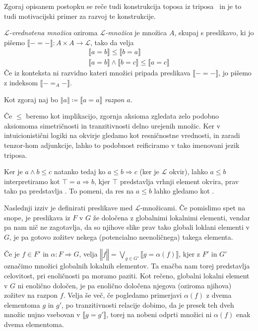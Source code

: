 Zgoraj opisanem postopku se reče tudi konstrukcija toposa iz
triposa~ in je to tudi motivacijski primer za
razvoj te konstrukcije.

\begin{definicija}
  \emph{\(ℒ\)-vrednotena množica} oziroma \emph{\(ℒ\)-množica} je množica \(A\),
  skupaj s preslikavo, ki jo pišemo \(⟦- = -⟧ : A×A → ℒ\), tako da velja
  \begin{align*}
    ⟦ a = b ⟧ ≤ ⟦ b = a ⟧\\
    ⟦ a = b ⟧ ∧ ⟦ b = c ⟧ ≤ ⟦ a = c ⟧
  \end{align*}
  Če iz konteksta ni razvidno kateri množici pripada preslikava \(⟦- = -⟧\),
  jo pišemo z indeksom \(⟦- =_A -⟧\).

  Kot zgoraj naj bo \(‖a‖ ≔ ⟦a = a⟧\) \emph{razpon \(a\)}.
\end{definicija}

Če \(≤\) beremo kot implikacijo, zgornja aksioma zgledata zelo podobno aksiomoma
simetričnosti in tranzitivnosti delno urejenih množic. Ker v intuicionistični
logiki na okvirje gledamo kot resničnostne vrednosti, in zaradi tenzor-hom
adjunkcije, lahko to podobnost reificiramo v tako imenovani jezik triposa.

Ker je \(a∧b ≤ c\) natanko tedaj ko \(a ≤ b⇒c\) (ker je \(ℒ\) okvir),
lahko \(a ≤ b\) interpretiramo kot \(⊤ = a⇒b\), kjer \(⊤\) predstavlja vrhnji
element okvira, prav tako pa predstavlja .
To pomeni, da res na \(a ≤ b\) lahko gledamo kot .

Naslednji izziv je definirati preslikave med \(ℒ\)-množicami.
Če pomislimo spet na snope, je preslikava iz \(F\) v \(G\) že določena z
globalnimi lokalnimi elementi, vendar pa nam nič ne zagotavlja, da so njihove
slike prav tako globali loklani elementi v \(G\), je pa gotovo zožitev nekega
(potencialno neenoličnega) takega elementa.

Če je \(f ∈ F'\) in \(α : F ⇒ G\), velja \(‖f‖ = ⋁_{g ∈ G'} ⟦g = α(f)⟧\),
kjer z \(F'\) in \(G'\) označimo množici globalnih lokalnih elementov.
Ta enačba nam torej predstavlja celovitost, pri enoličnosti pa moramo paziti.
Kot rečeno, globalni lokalni element v \(G\) ni enolično določen, je pa enolično
določena njegova (oziroma njihova) zožitev na razpon \(f\).
Velja še več, če pogledamo primerjavi \(α(f)\) z dvema elementoma \(g\) in
\(g'\), po tranzitivnosti relacije dobimo, da je presek teh dveh množic nujno
vsebovan v \(⟦g = g'⟧\), torej na nobeni odprti množici ni \(α(f)\) enak dvema
elementoma.

